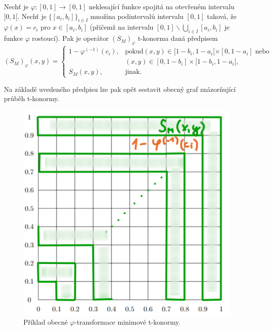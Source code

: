 \begin{sentence}
\cite{mitav}
    \label{t-conorm}
 Nech\v t je $\varphi:[0,1]\rightarrow [0,1]$
neklesající funkce spojitá na otevřeném intervalu $]0,1[$.
Nech\v t je $\{[a_i,b_i]\}_{i\in I}$ množina podinterval\r u
intervalu $[0,1]$ taková, že $\varphi(x)=c_i$ pro $x\in
[a_i,b_i]$ (přičemž na intervalu $[0,1]\backslash \bigcup \limits_{i \in I}
[a_i,b_i]$ je funkce $\varphi$
rostoucí).
Pak je operátor $(S_M)_{\varphi}$  t-konorma daná předpisem
$$ (S_M)_{\varphi}(x,y) = \begin{cases} 1-\varphi^{(-1)}(c_i), &\mbox {pokud
$(x,y)\in [1-b_i,1-a_i[\times[0,1-a_i]$ nebo}
\\ & (x,y)\in [0,1-b_i]\times[1-b_i,1-a_i[,
\\ S_M(x,y), &\mbox {jinak.}
\end{cases} $$
\end{sentence}

Na základě uvedeného předpisu lze pak opět sestavit obecný graf znázor\v nující pr\r uběh t-konormy.
  
    \begin{figure}[H]
    \caption{Příklad obecné $\varphi$-transformace minimové t-konormy.}
                \hspace{-1cm}
                \includegraphics[scale=0.47]{template-fig/t-konorma.pdf}
                \centering
            \end{figure}


